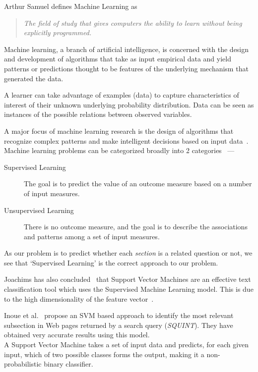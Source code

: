 \documentclass[a4paper,10pt]{report}
\begin{document}
Arthur Samuel defines Machine Learning as \begin{quote}\emph{The field of study that gives computers the ability to learn without being explicitly programmed.}\end{quote}

\noindent Machine learning, a branch of artificial intelligence, is concerned with the design and development of algorithms that take as input empirical data and yield patterns or predictions thought to be features of the underlying mechanism that generated the data.

A learner can take advantage of examples (data) to capture characteristics of interest of their unknown underlying probability distribution. Data can be seen as instances of the possible relations between observed variables.

A major focus of machine learning research is the design of algorithms that recognize complex patterns and make intelligent decisions based on input data~\cite{wikiML}. \\

\noindent Machine learning problems can be categorized broadly into 2 categories~\cite{elements} ---

\begin{description}
	\item[Supervised Learning] The goal is to predict the value of an outcome measure based on a number of input measures.
	\item[Unsupervised Learning] There is no outcome measure, and the goal is to describe the associations and patterns among a set of input measures.
\end{description}

\noindent As our problem is to predict whether each \emph{section} is a related question or not, we see that `Supervised Learning' is the correct approach to our problem.

Joachims has also concluded~\cite{joachims} that Support Vector Machines are an effective text classification tool which uses the Supervised Machine Learning model. This is due to the high dimensionality of the feature vector~\cite{squint}.

Inoue et al.~\cite{squint} propose an SVM based approach to identify the most relevant subsection in Web pages returned by a search query (\emph{SQUINT}). They have obtained very accurate results using this model. \\

\noindent A Support Vector Machine takes a set of input data and predicts, for each given input, which of two possible classes forms the output, making it a non-probabilistic binary classifier. 
\end{document}
